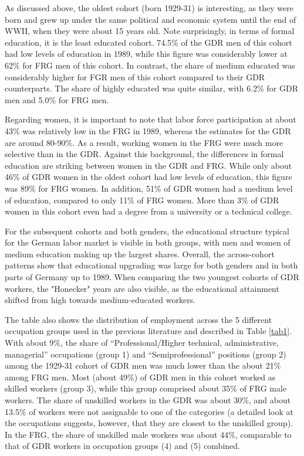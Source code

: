 \begin{Article}
\begin{refsection}[Spitz]

As discussed above, the oldest cohort (born 1929-31) is interesting, as they were born and grew up under the same political and economic system until the end of WWII, when they were about 15 years old. Note surprisingly, in terms of formal education, it is the least educated cohort. 74.5\% of the GDR men of this cohort had low levels of education in 1989, while this figure was considerably lower at 62\% for FRG men of this cohort. In contrast, the share of medium educated was considerably higher for FGR men of this cohort compared to their GDR counterparts. The share of highly educated was quite similar, with 6.2\% for GDR men and 5.0\% for FRG men. 

Regarding women, it is important to note that labor force participation at about 43\% was relatively low in the FRG in 1989, whereas the estimates for the GDR are around 80-90\%. As a result, working women in the FRG were much more selective than in the GDR. Against this background, the differences in formal education are striking between women in the GDR and FRG. While only about 46\% of GDR women in the oldest cohort had low levels of education, this figure was 89\% for FRG women. In addition, 51\% of GDR women had a medium level of education, compared to only 11\% of FRG women. More than 3\% of GDR women in this cohort even had a degree from a university or a technical college.  

For the subsequent cohorts and both genders, the educational structure typical for the German labor market is visible in both groups, with men and women of medium education making up the largest shares. Overall, the across-cohort patterns show that educational upgrading was large for both genders and in both parts of Germany up to 1989. When comparing the two youngest cohorts of GDR workers, the "Honecker" years are also visible, as the educational attainment shifted from high towards medium-educated workers.

The table also shows the distribution of employment across the 5 different occupation groups used in the previous literature and described in Table \ref{tab1}. With about 9\%, the share of ``Professional/Higher technical, administrative, managerial'' occupations (group 1) and ``Semiprofessional'' positions (group 2) among the 1929-31 cohort of GDR men was much lower than the about 21\% among FRG men. Most (about 49\%) of GDR men in this cohort worked as skilled workers (group 3), while this group comprised about 35\% of FRG male workers. The share of unskilled workers in the GDR was about 30\%, and about 13.5\% of workers were not assignable to one of the categories (a detailed look at the occupations suggests, however, that they are closest to the unskilled group). In the FRG, the share of unskilled male workers was about 44\%, comparable to that of GDR workers in occupation groups (4) and (5) combined. 


\end{refsection}
\end{Article}
